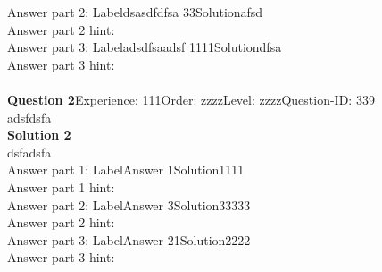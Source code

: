 \documentclass{article}
\begin{document}
Answer part 2: \hspace{10pt}Label\hspace{10pt}dsasdfdfsa 33\hspace{10pt}Solution\hspace{10pt}afsd\\
Answer part 2 hint: \hspace{15pt}\\
Answer part 3: \hspace{10pt}Label\hspace{10pt}adsdfsaadsf  1111\hspace{10pt}Solution\hspace{10pt}dfsa\\
Answer part 3 hint: \hspace{15pt}\\
\\[4pt]
\noindent\textbf{Question 2}\hspace{20pt}Experience: 111\hspace{20pt}Order: zzzz\hspace{20pt}Level: zzzz\hspace{20pt}Question-ID: 339\\[2pt]
adsfdsfa\\[4pt]
\noindent\textbf{Solution 2}\\[2pt]
dsfadsfa\\[4pt]
Answer part 1: \hspace{10pt}Label\hspace{10pt}Answer 1\hspace{10pt}Solution\hspace{10pt}1111\\
Answer part 1 hint: \hspace{15pt}\\
Answer part 2: \hspace{10pt}Label\hspace{10pt}Answer 3\hspace{10pt}Solution\hspace{10pt}33333\\
Answer part 2 hint: \hspace{15pt}\\
Answer part 3: \hspace{10pt}Label\hspace{10pt}Answer 21\hspace{10pt}Solution\hspace{10pt}2222\\
Answer part 3 hint: \hspace{15pt}\\
\end{document}
